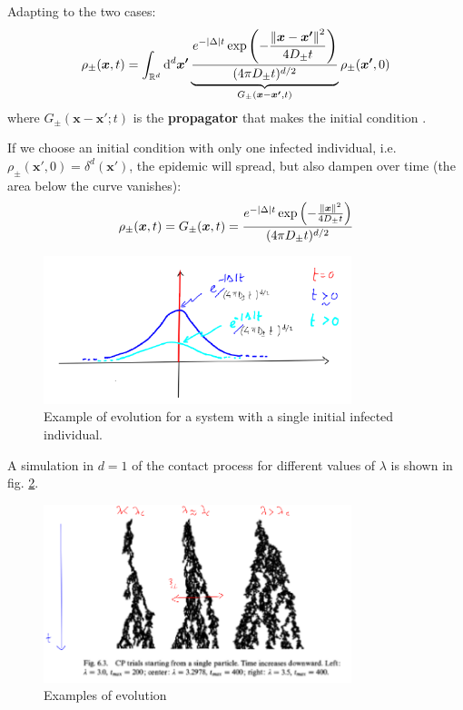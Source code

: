 \documentclass[../../main.tex]{subfiles}
\begin{document}
Adapting to the two cases:
\begin{align*}
    \rho_{\pm}(\bm{x}, t) = \int_{\mathbb{R}^d} \dd[d]{\bm{x'}} \underbrace{\frac{\displaystyle e^{-|\Delta|t} \exp\left(-\frac{\norm{\bm{x} - \bm{x'}}^2}{4 D_\pm t} \right)}{(4 \pi D_\pm t)^{d/2}}}_{G_\pm(\bm{x} - \bm{x'},t)}   \rho_{\pm}(\bm{x'},0)
\end{align*}
where $G_\pm(\bm{x}-\bm{x'};t)$ is the \textbf{propagator} that makes the initial condition .

\medskip

If we choose an initial condition with only one infected individual, i.e. $\rho_{\pm} (\bm{x'}, 0) = \delta^d(\bm{x'})$, the epidemic will spread, but also dampen over time (the area below the curve vanishes):
\begin{align}\label{eqn:contact-sol}
    \rho_{\pm}(\bm{x},t) = G_{\pm}(\bm{x},t) = \frac{e^{-|\Delta|t} \exp\left(-\frac{\norm{\bm{x}}^2}{4 D_{\pm} t} \right)}{(4 \pi D_{\pm} t)^{d/2}} 
\end{align}

\begin{figure}[H]
    \centering
    \includegraphics[width=0.8\textwidth]{contact-evo.png}
    \caption{Example of evolution for a system with a single initial infected individual.}
    \label{fig:contact-evo}
\end{figure}

A simulation in $d=1$ of the contact process for different values of $\lambda$ is shown in fig. \ref{fig:contact-simulation}.

\begin{figure}[H]
    \centering
    \includegraphics[width=0.8\textwidth]{contact-simulation.png}
    \caption{Examples of evolution}
    \label{fig:contact-simulation}
\end{figure}
\end{document}
